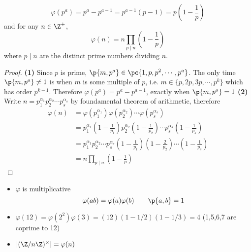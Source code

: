 \documentclass[11pt]{article}
\begin{document}
\begin{definition*}
\begin{enumerate}
        \[
            \varphi(p^a) = p^a - p^{a-1}
                = p^{a-1} ( p - 1 )
                = p (1 - \frac{1}{p})
        \]
        and for any $n\in \Z^+$,
        \[
            \varphi(n) = n \prod_{p \mid n} (1 - \frac{1}{p})
        \]
        where $p\mid n$ are the distinct prime numbers dividing $n$.
        \begin{proof}
            \textbf{(1)} Since $p$ is prime, $\p{m, p^a} \in \pc{1,p,p^2,\cdots,p^a}$. The only time $\p{m,p^a} \neq 1$ is when $m$ is some multiple of $p$, i.e. $m \in \{p, 2p, 3p, \cdots, p^k \}$ which has order $p^{k-1}$. Therefore $\varphi(p^a) = p^a - p^{a-1}$, exactly when $\p{m,p^a}=1$ \textbf{(2)}
            Write $n=p_1^{\alpha_1} p_2^{\alpha_2} \cdots p_s^{\alpha_s}$ by foundamental theorem of arithmetic, therefore
            \begin{align*}
                \varphi(n)
                &= \varphi(p_1^{\alpha_1}) \varphi(p_2^{\alpha_2}) \cdots \varphi(p_s^{\alpha_s}) \\
                &= p_1^{\alpha_1} (1- \frac{1}{p_1}) p_2^{\alpha_2} (1- \frac{1}{p_2}) \cdots p_s^{\alpha_s} (1- \frac{1}{p_s}) \\
                &= p_1^{\alpha_1} p_2^{\alpha_2} \cdots p_s^{\alpha_s} (1- \frac{1}{p_1}) (1- \frac{2}{p_2}) \cdots (1- \frac{1}{p_s}) \\
                &= n \prod_{p \mid n} (1 - \frac{1}{p})
            \end{align*}
        \end{proof}
        \begin{itemize}
            \item {} $\varphi$ is multiplicative
            \[
                \varphi(ab) = \varphi(a) \varphi(b)
                \quad \quad \p{a,b}=1    
            \]
            \item {} $\varphi(12)=\varphi(2^2)\varphi(3) = (12)(1-1/2)(1-1/3) = 4$ (1,5,6,7 are coprime to 12)
            \item {} $\order{\integermodnmul} = \varphi(n)$ 
        \end{itemize}
    \end{enumerate}
\end{definition*}


\newpage
\section{}
\end{document}
